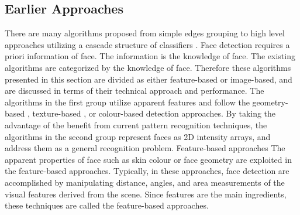 \subsection{Earlier Approaches}
There are many algorithms proposed from simple edges grouping \cite{Sakai1972,Sirohey1993,Leung1995,Yow1997} to high level approaches utilizing a cascade structure of classifiers \cite{Viola2004}\cite{Freund1995}. Face detection requires a priori information of face. The information is the knowledge of face. The existing algorithms are categorized by the knowledge of face.  Therefore these algorithms presented in this section are divided as either feature-based or image-based, and are discussed in terms of their technical approach and performance. The algorithms in the first group utilize apparent features and follow the geometry-based \cite{Leung1995}, texture-based \cite{Yow1997}, or colour-based \cite{Chai1998} detection approaches. By taking the advantage of the benefit from current pattern recognition techniques, the algorithms in the second group represent faces as 2D intensity arrays, and address them as a general recognition problem.
Feature-based approaches
The apparent properties of face such as skin colour or face geometry are exploited in the feature-based approaches. Typically, in these approaches, face detection are accomplished by manipulating distance, angles, and area measurements of the visual features derived from the scene. Since features are the main ingredients, these techniques are called the feature-based approaches.

